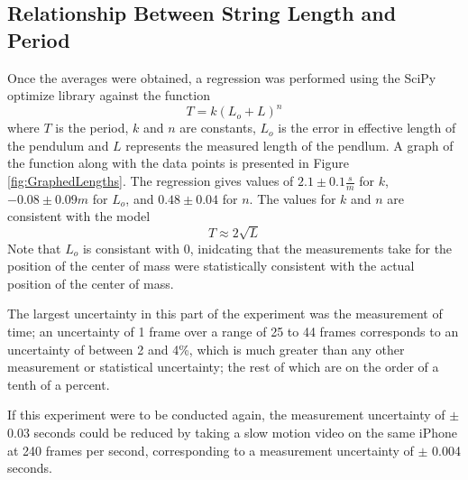 \documentclass[11pt]{article}
\begin{document}
        \subsection{Relationship Between String Length and Period} \label{sec:StringVsPeriod}
        {
        Once the averages were obtained, a regression was performed using the SciPy optimize library \cite{2020SciPy-NMeth} against the function
            \begin{equation}
                T = k(L_o + L)^n
            \end{equation}
        where $T$ is the period, $k$ and $n$ are constants, $L_o$ is the error in effective length of the pendulum and $L$ represents the measured length of the pendlum. A graph of the function along with the data points is presented in Figure \ref{fig:GraphedLengths}. The regression gives values of $2.1 \pm 0.1 \frac{s}{m}$ for $k$, $-0.08 \pm 0.09 m$ for $L_o$, and $0.48 \pm 0.04$ for $n$. The values for $k$ and $n$ are consistent with the model
            \begin{equation}
                T \approx 2\sqrt{L}
            \end{equation} 
        Note that $L_o$ is consistant with 0, inidcating that the measurements take for the position of the center of mass were statistically consistent with the actual position of the center of mass. 
        
        The largest uncertainty in this part of the experiment was the measurement of time; an uncertainty of 1 frame over a range of 25 to 44 frames corresponds to an uncertainty of between 2 and 4\%, which is much greater than any other measurement or statistical uncertainty; the rest of which are on the order of a tenth of a percent.

        If this experiment were to be conducted again, the measurement uncertainty of $\pm$ 0.03 seconds could be reduced by taking a slow motion video on the same iPhone at 240 frames per second, corresponding to a measurement uncertainty of $\pm$ 0.004 seconds.
        }
\end{document}
